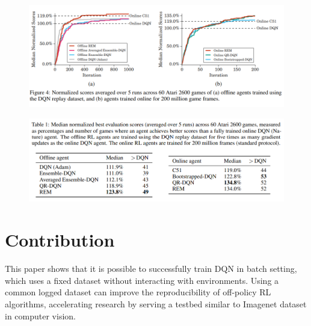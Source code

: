 \documentclass{article}
\begin{document}
\begin{figure}[H]
  \centering
    \includegraphics[width=0.6\linewidth]{3_2.png}
\end{figure}


\begin{figure}[H]
  \centering
    \includegraphics[width=0.6\linewidth]{3_3.png}
\end{figure}

\section{Contribution}
This paper shows that it is possible to successfully train DQN in batch setting, which uses a fixed dataset without interacting with environments. Using a common logged dataset can improve the reproducibility of off-policy RL algorithms, accelerating research by serving a testbed similar to Imagenet dataset in computer vision.



\end{document}
